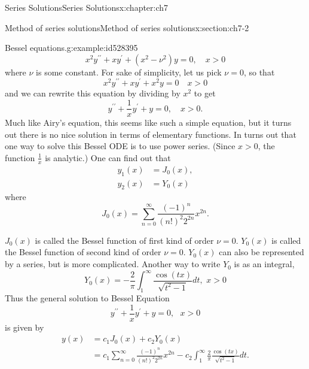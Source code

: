 \documentclass[oneside,10pt,]{book}
\numberwithin{equation}{section}
\numberwithin{equation}{section}
\newcommand{\amp}{&}
\begin{document}
\begin{chapterptx}{Series Solutions}{}{Series Solutions}{}{}{x:chapter:ch7}
\begin{sectionptx}{Method of series solutions}{}{Method of series solutions}{}{}{x:section:ch7-2}
\begin{example}{Bessel equations.}{g:example:id528395}
\begin{equation*}
x^{2}y^{\prime\prime}+xy^{\prime}+\left(x^{2}-\nu^{2}\right)y=0,\,\,\,\,\,\,x>0
\end{equation*}
where \(\nu\) is some constant. For sake of simplicity, let us pick \(\nu=0\), so that%
\begin{equation*}
x^{2}y^{\prime\prime}+xy^{\prime}+x^{2}y=0\,\,\,\,\,\,x>0
\end{equation*}
and we can rewrite this equation by dividing by \(x^{2}\) to get%
\begin{equation*}
y^{\prime\prime}+\frac{1}{x}y^{\prime}+y=0,\,\,\,\,\,\,x>0.
\end{equation*}
Much like Airy's equation, this seems like such a simple equation, but it turns out there is no nice solution in terms of elementary functions. In turns out that one way to solve this Bessel ODE is to use power series. (Since \(x > 0\), the function \(\frac{1}{x}\) is analytic.) One can find out that%
\begin{align*}
y_{1}(x) \amp =J_{0}(x),\\
y_{2}(x) \amp =Y_{0}(x)
\end{align*}
where%
\begin{equation*}
J_{0}(x) =\sum_{n=0}^{\infty}\frac{(-1)^{n}}{\left(n!\right)^{2}2^{2n}}x^{2n}.
\end{equation*}
%
\par
\(J_{0}(x)\) is called the Bessel function of first kind of order \(\nu=0\). \(Y_{0}(x)\) is called the Bessel function of second kind of order \(\nu=0\). \(Y_{0}(x)\) can also be represented by a series, but is more complicated. Another way to write \(Y_{0}\) is as an integral,%
\begin{equation*}
Y_{0}(x)=-\frac{2}{\pi}\int_{1}^{\infty}\frac{\cos\left(tx\right)}{\sqrt{t^{2}-1}}dt,\,\,x>0
\end{equation*}
Thus the general solution to Bessel Equation%
\begin{equation*}
y^{\prime\prime}+\frac{1}{x}y^{\prime}+y=0,\,\,\,\,x>0
\end{equation*}
is given by%
\begin{align*}
y(x) \amp =c_{1}J_{0}(x)+c_{2}Y_{0}(x)\\
\amp =c_{1}\sum_{n=0}^{\infty}\frac{(-1)^{n}}{\left(n!\right)^{2}2^{2n}}x^{2n}-c_{2}\int_{1}^{\infty}\frac{2}{\pi}\frac{\cos\left(tx\right)}{\sqrt{t^{2}-1}}dt.
\end{align*}
%
\end{example}
\end{sectionptx}
\end{chapterptx}
\end{document}
